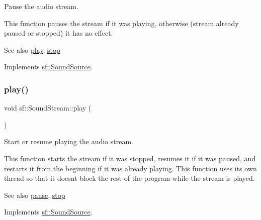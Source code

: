 Pause the audio stream. 

This function pauses the stream if it was playing, otherwise (stream already paused or stopped) it has no effect.

\begin{DoxySeeAlso}{See also}
\mbox{\hyperlink{classsf_1_1_sound_stream_afdc08b69cab5f243d9324940a85a1144}{play}}, \mbox{\hyperlink{classsf_1_1_sound_stream_a16cc6a0404b32e42c4dce184bb94d0f4}{stop}} \begin{DoxyVerb}\end{DoxyVerb}
 
\end{DoxySeeAlso}


Implements \mbox{\hyperlink{classsf_1_1_sound_source_a21553d4e8fcf136231dd8c7ad4630aba}{sf\+::\+Sound\+Source}}.

\mbox{\label{classsf_1_1_sound_stream_afdc08b69cab5f243d9324940a85a1144}} 
\subsubsection{\texorpdfstring{play()}{play()}}
{\footnotesize\ttfamily void sf\+::\+Sound\+Stream\+::play (\begin{DoxyParamCaption}{ }\end{DoxyParamCaption})\hspace{0.3cm}{\ttfamily [virtual]}}



Start or resume playing the audio stream. 

This function starts the stream if it was stopped, resumes it if it was paused, and restarts it from the beginning if it was already playing. This function uses its own thread so that it doesn\textquotesingle{}t block the rest of the program while the stream is played.

\begin{DoxySeeAlso}{See also}
\mbox{\hyperlink{classsf_1_1_sound_stream_a932ff181e661503cad288b4bb6fe45ca}{pause}}, \mbox{\hyperlink{classsf_1_1_sound_stream_a16cc6a0404b32e42c4dce184bb94d0f4}{stop}} \begin{DoxyVerb}\end{DoxyVerb}
 
\end{DoxySeeAlso}


Implements \mbox{\hyperlink{classsf_1_1_sound_source_a6e1bbb1f247ed8743faf3b1ed6f2bc21}{sf\+::\+Sound\+Source}}.

